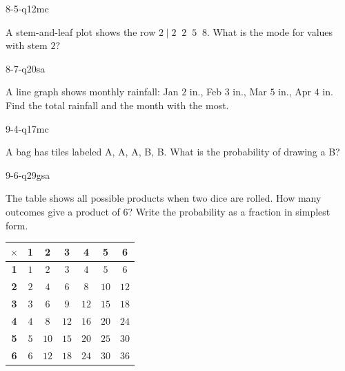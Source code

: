 \begin{practiceQuestion}{8-5-q12}{mc}
\begin{questionText}
A stem-and-leaf plot shows the row $2 \mid 2\;\;2\;\;5\;\;8$. What is the mode for values with stem $2$?
\end{questionText}
\end{practiceQuestion}

\begin{practiceQuestion}{8-7-q20}{sa}
\begin{questionText}
A line graph shows monthly rainfall: Jan $2$ in., Feb $3$ in., Mar $5$ in., Apr $4$ in. Find the total rainfall and the month with the most.
\end{questionText}
\end{practiceQuestion}

\begin{practiceQuestion}{9-4-q17}{mc}
\begin{questionText}
A bag has tiles labeled A, A, A, B, B. What is the probability of drawing a B?
\end{questionText}
\end{practiceQuestion}

\begin{practiceQuestion}{9-6-q29}{gsa}
\begin{questionText}
The table shows all possible products when two dice are rolled. How many outcomes give a product of $6$? Write the probability as a fraction in simplest form.

\begin{center}
\begin{tabular}{|c|c|c|c|c|c|c|}
\hline
$\times$ & \textbf{1} & \textbf{2} & \textbf{3} & \textbf{4} & \textbf{5} & \textbf{6} \\
\hline
\textbf{1} & $1$ & $2$ & $3$ & $4$ & $5$ & $6$ \\
\hline
\textbf{2} & $2$ & $4$ & $6$ & $8$ & $10$ & $12$ \\
\hline
\textbf{3} & $3$ & $6$ & $9$ & $12$ & $15$ & $18$ \\
\hline
\textbf{4} & $4$ & $8$ & $12$ & $16$ & $20$ & $24$ \\
\hline
\textbf{5} & $5$ & $10$ & $15$ & $20$ & $25$ & $30$ \\
\hline
\textbf{6} & $6$ & $12$ & $18$ & $24$ & $30$ & $36$ \\
\hline
\end{tabular}
\end{center}
\end{questionText}
\end{practiceQuestion}


